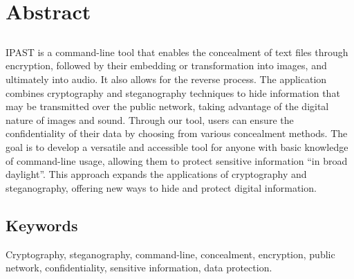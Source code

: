 \chapter*{Abstract}
\section*{\tituloPortadaEngVal}

IPAST is a command-line tool that enables the concealment of text files through encryption, followed by their embedding or transformation into images, and ultimately into audio. It also allows for the reverse process. The application combines cryptography and steganography techniques to hide information that may be transmitted over the public network, taking advantage of the digital nature of images and sound. Through our tool, users can ensure the confidentiality of their data by choosing from various concealment methods. The goal is to develop a versatile and accessible tool for anyone with basic knowledge of command-line usage, allowing them to protect sensitive information ``in broad daylight''. This approach expands the applications of cryptography and steganography, offering new ways to hide and protect digital information.


\section*{Keywords}

\noindent Cryptography, steganography, command-line, concealment, encryption, public network, confidentiality, sensitive information, data protection.



